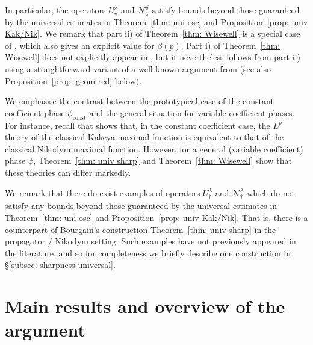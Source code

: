 \documentclass[reqno]{amsart}
\numberwithin{equation}{section}
\newcommand{\cN}{\mathcal{N}}
\theoremstyle{plain}
\theoremstyle{definition}
\begin{document}
In particular, the operators $U_{\star}^{\lambda}$ and $\cN^{\delta}_{\star}$ satisfy bounds beyond those guaranteed by the universal estimates in Theorem~\ref{thm: uni osc} and Proposition~\ref{prop: univ Kak/Nik}. We remark that part ii) of Theorem~\ref{thm: Wisewell} is a special case of \cite[Theorem 12]{Wisewell2005}, which also gives an explicit value for $\beta(p)$. Part i) of  Theorem~\ref{thm: Wisewell} does not explicitly appear in \cite{Wisewell2005}, but it nevertheless follows from part ii) using a straightforward variant of a well-known argument from \cite{Bourgain1991} (see also Proposition~\ref{prop: geom red} below). 

We emphasise the contrast between the prototypical case of the constant coefficient phase $\phi_{\mathrm{const}}$ and the general situation for variable coefficient phases. For instance, recall that \cite{Tao1999} shows that, in the constant coefficient case, the $L^p$ theory of the classical Kakeya maximal function is equivalent to that of the classical Nikodym maximal function. However, for a general (variable coefficient) phase $\phi$, Theorem~\ref{thm: univ sharp} and Theorem~\ref{thm: Wisewell} show that these theories can differ markedly. 

We remark that there do exist examples of operators $U_{\dagger}^{\lambda}$ and $\cN_{\dagger}^{\lambda}$ which do not satisfy any bounds beyond those guaranteed by the universal estimates in Theorem~\ref{thm: uni osc} and Proposition~\ref{prop: univ Kak/Nik}. That is, there is a counterpart of Bourgain's construction Theorem~\ref{thm: univ sharp} in the propagator / Nikodym setting. Such examples have not previously appeared in the literature, and so for completeness we briefly describe one construction in \S\ref{subsec: sharpness universal}.






\section{Main results and overview of the argument}\label{sec: main results}

\end{document}
